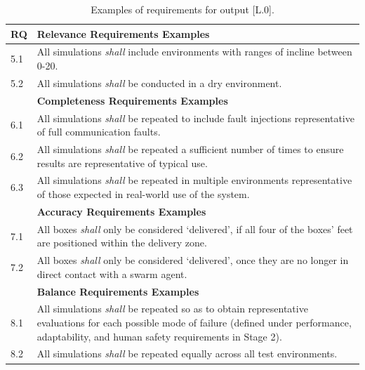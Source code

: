 \documentclass[runningheads]{llncs}
\begin{document}
\begin{table}[!h]%
	\centering
	\begin{tabular}{p{0.6cm} p{11.6cm}}
		\textbf{RQ} & \textbf{Relevance Requirements Examples} \\
		\hline
		5.1 & All simulations \emph{shall} include environments with ranges of incline between 0-20\textdegree.\\
		\hline
		5.2 & All simulations \emph{shall} be conducted in a dry environment.\\
		\hline
		& \textbf{Completeness Requirements Examples} \\
		\hline
		6.1 & All simulations \emph{shall} be repeated to include fault injections representative of full communication faults.\\
		\hline
		6.2 & All simulations \emph{shall} be repeated a sufficient number of times to ensure results are representative of typical use.\\
		\hline
		6.3 & All simulations \emph{shall} be repeated in multiple environments representative of those expected in real-world use of the system.\\
		\hline
		& \textbf{Accuracy Requirements Examples} \\
		\hline
		7.1 & All boxes \emph{shall} only be considered `delivered’, if all four of the boxes’ feet are positioned within the delivery zone.\\
		\hline
		7.2 & All boxes \emph{shall} only be considered `delivered’, once they are no longer in direct contact with a swarm agent.\\
		\hline
		& \textbf{Balance Requirements Examples} \\
		\hline
		8.1 & All simulations \emph{shall} be repeated so as to obtain representative evaluations for each possible mode of failure (defined under performance, adaptability, and human safety requirements in Stage 2).\\
		\hline
		8.2 & All simulations \emph{shall} be repeated equally across all test environments.\\
		\hline
	\end{tabular}
	\caption{Examples of requirements for output [L.0].}
	\label{tab:L0_req}
	\vspace{-4ex}
\end{table}
\end{document}
